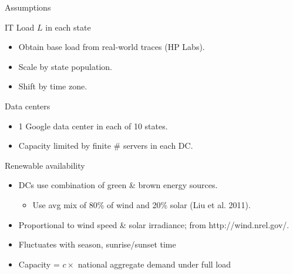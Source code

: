 \documentclass[xcolor=dvipsnames]{beamer}
\begin{document}
\begin{frame}{Assumptions}


	\begin{block}{IT Load $L$ in each state}
 	\begin{itemize}
		\item 	Obtain base load from real-world traces (HP Labs).
		\item 	Scale by state population. 
		\item 	Shift by time zone.
	\end{itemize}
	\end{block}
\vspace{-3mm}
	\begin{block}{Data centers}
			\begin{itemize}
				\item        1 Google data center in each of 10 states. %
				\item 	Capacity limited by finite \# servers in each DC.
			\end{itemize}
	\end{block}
\vspace{-3mm}
	\begin{block}{Renewable availability} 
	\begin{itemize}
		\item 	DCs use combination of green \& brown energy sources.
			\begin{itemize}
				\item  Use avg mix of 80\% of wind and 20\% solar (Liu et al. 2011). %
			\end{itemize}
		\item  Proportional to wind speed \& solar irradiance; from http://wind.nrel.gov/.  %
		\item Fluctuates with season, sunrise/sunset time
		\item Capacity = $c \times$ national aggregate demand under full load
		\end{itemize}
	\end{block}
\end{frame}
\end{document}
